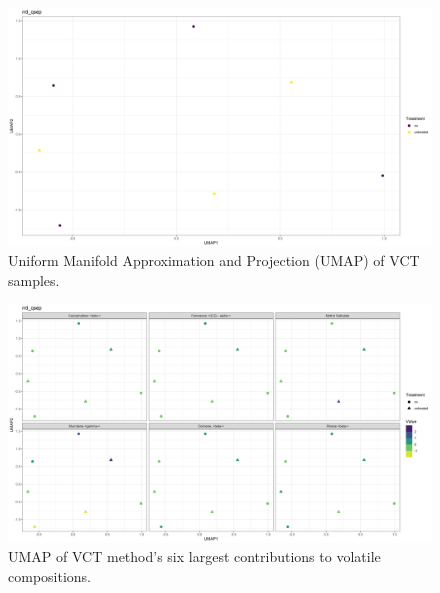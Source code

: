 \documentclass{ufdissertation}[overrideChapters] %
\begin{document}
{\begin{figure}
{\centering \includegraphics[width=1\linewidth]{figure/rrv_volatiles_umap_rrd_qsep} 

}

\caption[Uniform Manifold Approximation and Projection (UMAP) of VCT samples]{Uniform Manifold Approximation and Projection (UMAP) of VCT samples.}\label{fig:qsep-vocs-umap}
\end{figure}
\begin{figure}

{\centering \includegraphics[width=1\linewidth]{figure/rrv_volatiles_umap_chems_rrd_qsep} 

}

\caption[UMAP of VCT method's six largest contributions to volatile compositions]{UMAP of VCT method's six largest contributions to volatile compositions.}\label{fig:qsep-vocs-umap-chems}
\end{figure}
\begin{table}


\end{table}}
\end{document}
